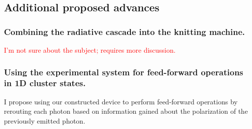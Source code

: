 \subsection{Additional proposed advances}
\subsubsection{Combining the radiative cascade into the knitting machine.}
\textcolor{red} {I'm not sure about the subject; requires more discussion. }
\subsubsection{Using the experimental system for feed-forward operations in 1D cluster states.}
I propose using our constructed device to perform feed-forward operations by rerouting each photon based on information gained about the polarization of the previously emitted photon. 